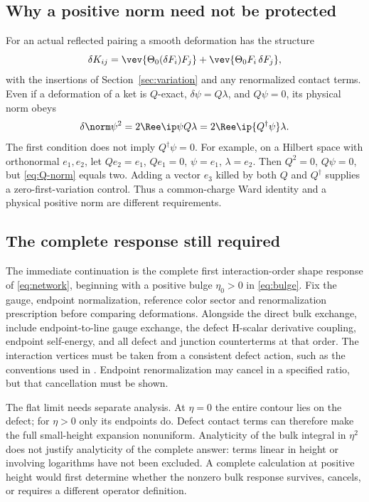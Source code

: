 \subsection{Why a positive norm need not be protected}

For an actual reflected pairing a smooth deformation has the structure
\begin{equation}
 \delta K_{ij}=\vev{\Theta_0(\delta F_i)F_j}
                 +\vev{\Theta_0F_i\,\delta F_j},
\end{equation}
with the insertions of Section~\ref{sec:variation} and any renormalized
contact terms. Even if a deformation of a ket is $Q$-exact,
$\delta\psi=Q\lambda$, and $Q\psi=0$, its physical norm obeys
\begin{equation}\label{eq:Q-norm}
 \delta\norm\psi^2=2\Ree\ip\psi{Q\lambda}
                  =2\Ree\ip{Q^\dagger\psi}\lambda.
\end{equation}
The first condition does not imply $Q^\dagger\psi=0$. For example,
on a Hilbert space with orthonormal $e_1,e_2$, let
$Qe_2=e_1$, $Qe_1=0$, $\psi=e_1$, $\lambda=e_2$.
Then $Q^2=0$, $Q\psi=0$, but \eqref{eq:Q-norm} equals two.
Adding a vector $e_3$ killed by both $Q$ and $Q^\dagger$ supplies a
zero-first-variation control. Thus a common-charge Ward identity
and a physical positive norm are different requirements.

\subsection{The complete response still required}


The immediate continuation is the complete first interaction-order
shape response of \eqref{eq:network}, beginning with a positive bulge
$\eta_0>0$ in \eqref{eq:bulge}. Fix the gauge, endpoint normalization,
reference color sector and renormalization prescription before
comparing deformations. Alongside the direct bulk exchange, include
endpoint-to-line gauge exchange, the defect H-scalar derivative
coupling, endpoint self-energy, and all defect and junction
counterterms at that order. The interaction vertices must be taken
from a consistent defect action, such as the conventions used in
\cite{DFO,Baker}. Endpoint renormalization may cancel in a specified
ratio, but that cancellation must be shown.

The flat limit needs separate analysis. At $\eta=0$ the entire
contour lies on the defect; for $\eta>0$ only its endpoints do.
Defect contact terms can therefore make the full small-height
expansion nonuniform. Analyticity of the bulk integral in $\eta^2$
does not justify analyticity of the complete answer: terms linear
in height or involving logarithms have not been excluded. A complete
calculation at positive height would first determine whether the
nonzero bulk response survives, cancels, or requires a different
operator definition.
